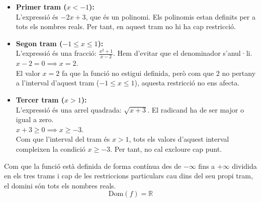 \documentclass[12pt,a4paper]{article}
\begin{document}
\begin{itemize}
    \item \textbf{Primer tram ($x < -1$):} \\
    L'expressió és $-2x+3$, que és un polinomi. Els polinomis estan definits per a tots els nombres reals. Per tant, en aquest tram no hi ha cap restricció.
    
    \item \textbf{Segon tram ($-1 \le x \le 1$):} \\
    L'expressió és una fracció: $\frac{x^2+1}{x-2}$. Hem d'evitar que el denominador s'anul·li. \\
    $x-2 = 0 \implies x = 2$. \\
    El valor $x=2$ fa que la funció no estigui definida, però com que $2$ no pertany a l'interval d'aquest tram ($-1 \le x \le 1$), aquesta restricció no ens afecta.
    
    \item \textbf{Tercer tram ($x > 1$):} \\
    L'expressió és una arrel quadrada: $\sqrt{x+3}$. El radicand ha de ser major o igual a zero. \\
    $x+3 \ge 0 \implies x \ge -3$. \\
    Com que l'interval del tram és $x > 1$, tots els valors d'aquest interval compleixen la condició $x \ge -3$. Per tant, no cal excloure cap punt.
\end{itemize}

Com que la funció està definida de forma contínua des de $-\infty$ fins a $+\infty$ dividida en els tres trams i cap de les restriccions particulars cau dins del seu propi tram, el domini són tots els nombres reals.
\[ \text{Dom}(f) = \mathbb{R} \]
\end{document}
